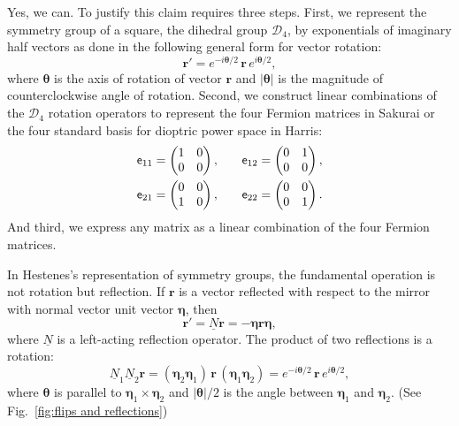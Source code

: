 \documentclass[11pt,twocolumn]{article}
\begin{document}
Yes, we can.  To justify this claim requires three steps.  First, we represent the symmetry group of a square, the dihedral group $\mathcal D_4$, by exponentials of imaginary half vectors as done in the following general form for vector rotation\cite{Vold_1993_ajp61i6pp491-504_p499}:
\begin{equation}
\label{eq:general vector rotation intro}
\mathbf r'=e^{-i\bm\theta/2}\,\mathbf r\,e^{i\bm\theta/2},
\end{equation}
where $\bm\theta$ is the axis of rotation of vector $\mathbf r$ and $|\bm\theta|$ is the magnitude of counterclockwise angle of rotation.  Second, we construct linear combinations of the $\mathcal D_4$ rotation operators to represent the four Fermion matrices in Sakurai\cite{Sakurai_1967_AdvancedQuantumMechanics_p80} or the four standard basis for dioptric power space in Harris\cite{Harris_1997_OptomVisSci76i6pp349-366_p357}:
\begin{eqnarray}
\label{eq:e_11 and e_12 matrix intro}
\textsf e_{11}=
\begin{pmatrix}
1&0\\
0&0
\end{pmatrix}
,&\quad&
\textsf e_{12}=
\begin{pmatrix}
0&1\\
0&0
\end{pmatrix}
,
\\
\label{eq:e_21 and e_22 matrix intro}
\textsf e_{21}=
\begin{pmatrix}
0&0\\
1&0
\end{pmatrix}
,&\quad&
\textsf e_{22}=
\begin{pmatrix}
0&0\\
0&1
\end{pmatrix}
.
\end{eqnarray}
And third, we express any matrix as a linear combination of the four Fermion matrices.

In Hestenes's representation of symmetry groups, the fundamental operation is not rotation but reflection.  If $\mathbf r$ is a vector reflected with respect to the mirror with normal vector unit vector $\bm\eta$, then\cite{Hestenes_2002_AGACSEpp3-34_p7}
\begin{equation}
\label{eq:r' is -nrn intro}
\mathbf r'=\underline N\mathbf r=-\bm\eta\mathbf r\bm\eta,
\end{equation}
where $\underline N$ is a left-acting reflection operator.  The product of two reflections is a rotation\cite{Hestenes_2002_AGACSEpp3-34_p8}:
\begin{equation}
\label{eq:reflection N_1 N_2 r intro}
\underline N_1\underline N_2\mathbf r=(\bm\eta_2\bm\eta_1)\,\mathbf r\,(\bm\eta_1\bm\eta_2)=e^{-i\bm\theta/2}\mathbf \,\mathbf r\,e^{i\bm\theta/2},
\end{equation}
where $\bm\theta$ is parallel to $\bm\eta_1\times\bm\eta_2$ and $|\bm\theta|/2$ is the angle between $\bm\eta_1$ and $\bm\eta_2$.  (See Fig.~\ref{fig:flips and reflections})
\end{document}
